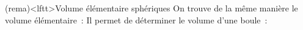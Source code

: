 \documentclass[../../main/main.tex]{subfiles}
\begin{document}
\begin{tcb}(rema)<lftt>{Volume élémentaire sphériques}
	On trouve de la même manière le volume élémentaire~:
	\psw{%
		\[
			\boxed{\dd{V} = r^{2}\sin(\theta)\dd{r}\dd{\th}\dd{\f}}
		\]
	}%
	Il permet de déterminer le volume d'une boule~:
	\psw{%
		\[
			V\ind{boule}
			= \iiint_{r,\th,\f}
			= \int_{r'=0}^{R} r'^2\dd{r'}
			\int_{\th' = 0}^{\pi} \sin\th'\dd{\th'}
			\int_{\f'=0}^{2\pi} \dd{\f}
			= \int_{r'=0}^{R} 4\pi r'^2 \dd{r}
			= \boxed{\frac{4}{3}\pi R^3}
		\]
	}%
	\vspace{-15pt}
\end{tcb}
\end{document}
